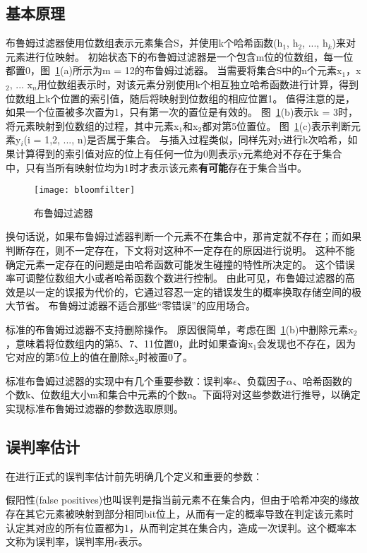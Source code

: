 \subsection{基本原理}
布鲁姆过滤器使用位数组表示元素集合S，并使用k个哈希函数(h$_1$, h$_2$, ..., h$_k$)来对元素进行位映射。
初始状态下的布鲁姆过滤器是一个包含m位的位数组，每一位都置0，图~\ref{fig:bf}(a)所示为m = 12的布鲁姆过滤器。
当需要将集合S中的n个元素x$_1$，x$_2$, ... x$_n$用位数组表示时，对该元素分别使用k个相互独立哈希函数进行计算，得到位数组上k个位置的索引值，随后将映射到位数组的相应位置1。
值得注意的是，如果一个位置被多次置为1，只有第一次的置位是有效的。
图~\ref{fig:bf}(b)表示k = 3时，将元素映射到位数组的过程，其中元素x$_1$和x$_2$都对第5位置位。
图~\ref{fig:bf}(c)表示判断元素y$_i$(i = 1,2, ..., n)是否属于集合。
与插入过程类似，同样先对y进行k次哈希，如果计算得到的索引值对应的位上有任何一位为0则表示y元素绝对不存在于集合中，只有当所有映射位均为1时才表示该元素\textbf{有可能}存在于集合当中。
\begin{figure}[htbp]
\centering
\texttt{[image: bloomfilter]}
\caption{布鲁姆过滤器}\label{fig:bf}
\end{figure}
换句话说，如果布鲁姆过滤器判断一个元素不在集合中，那肯定就不存在；而如果判断存在，则不一定存在，下文将对这种不一定存在的原因进行说明。
这种不能确定元素一定存在的问题是由哈希函数可能发生碰撞的特性所决定的。
这个错误率可调整位数组大小或者哈希函数个数进行控制。
由此可见，布鲁姆过滤器的高效是以一定的误报为代价的，它通过容忍一定的错误发生的概率换取存储空间的极大节省。
布鲁姆过滤器不适合那些“零错误”的应用场合。

标准的布鲁姆过滤器不支持删除操作。
原因很简单，考虑在图~\ref{fig:bf}(b)中删除元素x$_2$，意味着将位数组内的第5、7、11位置0，此时如果查询x$_1$会发现也不存在，因为它对应的第5位上的值在删除x$_2$时被置0了。

标准布鲁姆过滤器的实现中有几个重要参数：误判率\begin{math}\epsilon\end{math}、负载因子\begin{math}\alpha\end{math}、哈希函数的个数k、位数组大小m和集合中元素的个数n。下面将对这些参数进行推导，以确定实现标准布鲁姆过滤器的参数选取原则。

\subsection{误判率估计}
在进行正式的误判率估计前先明确几个定义和重要的参数：
\begin{definition}
	假阳性(false positives)也叫误判是指当前元素不在集合内，但由于哈希冲突的缘故存在其它元素被映射到部分相同bit位上，从而有一定的概率导致在判定该元素时认定其对应的所有位置都为1，从而判定其在集合内，造成一次误判。这个概率本文称为误判率，误判率用\begin{math}\epsilon\end{math}表示。
\end{definition}

